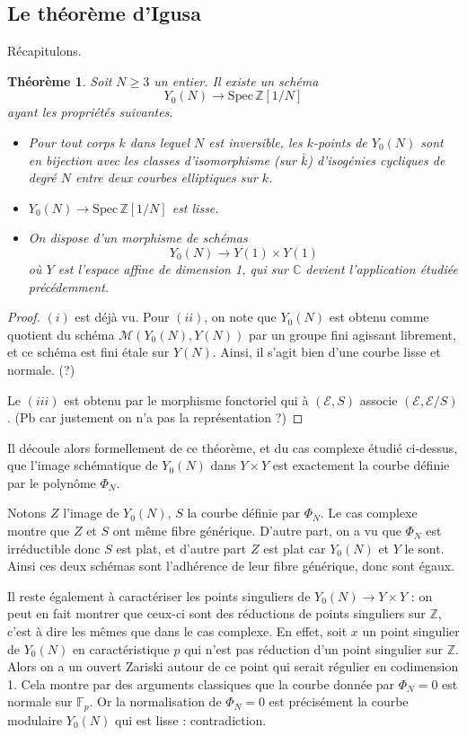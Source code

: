 \documentclass[11pt,a4paper]{article}
\newcommand{\Z}{\mathbb{Z}}
\newcommand{\C}{\mathbb{C}}
\newcommand{\F}{\mathbb{F}}
\newcommand{\E}{\mathcal{E}}
\newcommand{\M}{\mathcal{M}}
\newcommand{\vers}{\longrightarrow}
\newcommand{\Spec}{\mathrm{Spec}\,}
\newtheorem*{thm}{Théorème}
\theoremstyle{definition}
\begin{document}
\subsection{Le théorème d'Igusa}

Récapitulons.

\begin{thm} Soit $N\geq 3$ un entier. Il existe un schéma 
$$Y_0(N)\vers \Spec \Z[1/N]$$
ayant les propriétés suivantes.
\begin{itemize}
\item[(i)] Pour tout corps $k$ dans lequel $N$ est inversible, les $k$-points de $Y_0(N)$ sont en bijection avec les classes d'isomorphisme (sur $\bar{k}$) d'isogénies cycliques de degré $N$ entre deux courbes elliptiques sur $k$.
\item[(ii)] $Y_0(N)\vers \Spec \Z[1/N]$ est lisse.
\item[(iii)] On dispose d'un morphisme de schémas 
$$Y_0(N) \vers Y(1)\times Y(1)$$
où $Y$ est l'espace affine de dimension 1, qui sur $\C$ devient l'application étudiée précédemment.
\end{itemize}

\end{thm}

\begin{proof}
$(i)$ est déjà vu. Pour $(ii)$, on note que $Y_0(N)$ est obtenu comme quotient du schéma $\M(Y_0(N), Y(N))$ par un groupe fini agissant librement, et ce schéma est fini étale sur $Y(N)$. Ainsi, il s'agit bien d'une courbe lisse et normale. (?)

Le $(iii)$ est obtenu par le morphisme fonctoriel qui à $(\E,S)$ associe $(\E, \E/S)$. (Pb car justement on n'a pas la représentation ?)
\end{proof}

Il découle alors formellement de ce théorème, et du cas complexe étudié ci-dessus, que l'image schématique de $Y_0(N)$ dans $Y\times Y$ est exactement la courbe définie par le polynôme $\Phi_N$.

Notons $Z$ l'image de $Y_0(N)$, $S$ la courbe définie par $\Phi_N$. Le cas complexe montre que $Z$ et $S$ ont même fibre générique. D'autre part, on a vu que $\Phi_N$ est irréductible donc $S$ est plat, et d'autre part $Z$ est plat car $Y_0(N)$ et $Y$ le sont. Ainsi ces deux schémas sont l'adhérence de leur fibre générique, donc sont égaux.

Il reste également à caractériser les points singuliers de $Y_0(N)\vers Y\times Y$ : on peut en fait montrer que ceux-ci sont des réductions de points singuliers sur $\Z$, c'est à dire les mêmes que dans le cas complexe. En effet, soit $x$ un point singulier de $Y_0(N)$ en caractéristique $p$ qui n'est pas réduction d'un point singulier sur $\Z$. Alors on a un ouvert Zariski autour de ce point qui serait régulier en codimension 1. Cela montre par des arguments classiques que la courbe donnée par $\Phi_N=0$ est normale sur $\F_p$. Or la normalisation de $\Phi_N=0$ est précisément la courbe modulaire $Y_0(N)$ qui est lisse : contradiction.
\end{document}
